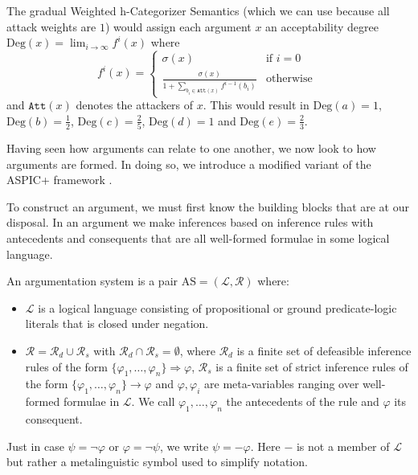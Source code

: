 \documentclass[runningheads]{llncs}
\newcommand{\R}{\mathcal{R}}
\newcommand{\Rs}{\mathcal{R}_s}
\newcommand{\Rd}{\mathcal{R}_d}
\newcommand{\La}{\mathcal{L}}
\begin{document}
\begin{example}
The gradual Weighted h-Categorizer Semantics \cite{DBLP:conf/ijcai/AmgoudBDV17} (which we can use because all attack weights are $1$) would assign each argument $x$ an acceptability degree $\text{Deg}(x)=\lim_{i \rightarrow \infty}f^i(x)$ where $$f^i(x) = \begin{cases} \sigma(x) &\mbox{if } i=0 \\
\frac{\sigma(x)}{1+\sum_{b_i\in \texttt{Att}(x)}f^{i-1}(b_i)} &\mbox{otherwise }\end{cases}$$ and $\texttt{Att}(x)$ denotes the attackers of $x$. This would result in $\text{Deg}(a)=1$, $\text{Deg}(b)=\frac{1}{2}$, $\text{Deg}(c)=\frac{2}{5}$, $\text{Deg}(d)=1$ and $\text{Deg}(e)=\frac{2}{3}$. 
\end{example}

Having seen how arguments can relate to one another, we now look to how arguments are formed. In doing so, we introduce a modified variant of the ASPIC+ framework \cite{DBLP:journals/argcom/ModgilP14}.

To construct an argument, we must first know the building blocks that are at our disposal. In an argument we make inferences based on inference rules with antecedents and consequents that are all well-formed formulae in some logical language.

\begin{definition}\label{AS}
An argumentation system is a pair $\text{AS} = ( \La,\R )$ where:
\begin{itemize}
    \item $\La$ is a logical language consisting of propositional or ground predicate-logic literals that is closed under negation.
    \item $\R = \Rd \cup \Rs$ with $\Rd \cap \Rs = \emptyset$, where $\Rd$ is a finite set of defeasible inference rules of the form $\{\varphi_1, \dots,\varphi_n\} \Rightarrow \varphi$, $\Rs$ is a finite set of strict inference rules of the form $\{\varphi_1, \dots,\varphi_n\} \rightarrow \varphi$ and $\varphi, \varphi_i$ are meta-variables ranging over well-formed formulae in $\La$. We call $\varphi_1, \dots,\varphi_n$%
    the antecedents of the rule and $\varphi$ its consequent.
\end{itemize}
\end{definition}

Just in case $\psi = \neg \varphi$ or $\varphi = \neg \psi$, we write $\psi = -\varphi$. Here $-$ is not a member of $\La$ but rather a metalinguistic symbol used to simplify notation.
\end{document}
